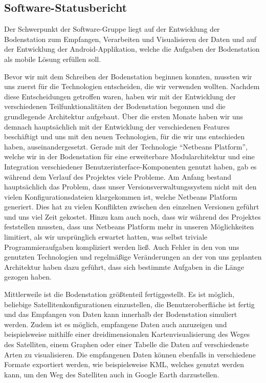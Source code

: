 \subsection{Software-Statusbericht}
Der Schwerpunkt der Software-Gruppe liegt auf der Entwicklung der Bodenstation zum Empfangen, Verarbeiten und Visualisieren der Daten und auf der Entwicklung der Android-Applikation, welche die Aufgaben der Bodenstation als mobile Lösung erfüllen soll.

Bevor wir mit dem Schreiben der Bodenstation beginnen konnten, mussten wir uns zuerst für die Technologien entscheiden, die wir verwenden wollten. Nachdem diese Entscheidungen getroffen waren, haben wir mit der Entwicklung der verschiedenen Teilfunktionalitäten der Bodenstation begonnen und die grundlegende Architektur aufgebaut. Über die ersten Monate haben wir uns demnach hauptsächlich mit der Entwicklung der verschiedenen Features beschäftigt und uns mit den neuen Technologien, für die wir uns entschieden haben, auseinandergesetzt. Gerade mit der Technologie ``Netbeans Platform'', welche wir in der Bodenstation für eine erweiterbare Modularchitektur und eine Integration verschiedener Benutzerinterface-Komponenten genutzt haben, gab es während dem Verlauf des Projektes viele Probleme. Am Anfang bestand hauptsächlich das Problem, dass unser Versionsverwaltungssystem nicht mit den vielen Konfigurationsdateien klargekommen ist, welche Netbeans Platform generiert. Dies hat zu vielen Konflikten zwischen den einzelnen Versionen geführt und uns viel Zeit gekostet. Hinzu kam auch noch, dass wir während des Projektes feststellen mussten, dass uns Netbeans Platform mehr in unseren Möglichkeiten limitiert, als wir ursprünglich erwartet hatten, was selbst triviale Programmieraufgaben kompliziert werden ließ. Auch Fehler in den von uns genutzten Technologien und regelmäßige Veränderungen an der von uns geplanten Architektur haben dazu geführt, dass sich bestimmte Aufgaben in die Länge gezogen haben.

Mittlerweile ist die Bodenstation größtenteil fertiggestellt. Es ist möglich, beliebige Satellitenkonfigurationen einzustellen, die Benutzeroberfläche ist fertig und das Empfangen von Daten kann innerhalb der Bodenstation simuliert werden. Zudem ist es möglich, empfangene Daten auch anzuzeigen und beispielsweise mithilfe einer dreidimensionalen Kartenvisualisierung des Weges des Satelliten, einem Graphen oder einer Tabelle die Daten auf verschiedenste Arten zu visualisieren. Die empfangenen Daten können ebenfalls in verschiedene Formate exportiert werden, wie beispielsweise KML, welches genutzt werden kann, um den Weg des Satelliten auch in Google Earth darzustellen.

